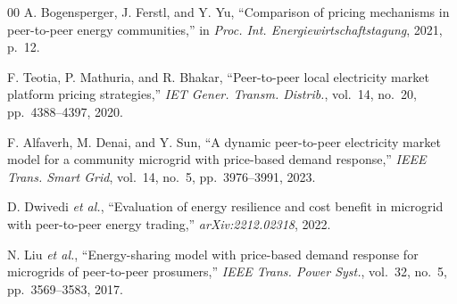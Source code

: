 \documentclass[conference]{IEEEtran}
\begin{document}
{\begin{thebibliography}{00}
A. Bogensperger, J. Ferstl, and Y. Yu, ``Comparison of pricing mechanisms in peer-to-peer energy communities,'' in \textit{Proc. Int. Energiewirtschaftstagung}, 2021, p.~12.

F. Teotia, P. Mathuria, and R. Bhakar, ``Peer-to-peer local electricity market platform pricing strategies,'' \textit{IET Gener. Transm. Distrib.}, vol.~14, no.~20, pp.~4388--4397, 2020.

F. Alfaverh, M. Denai, and Y. Sun, ``A dynamic peer-to-peer electricity market model for a community microgrid with price-based demand response,'' \textit{IEEE Trans. Smart Grid}, vol.~14, no.~5, pp.~3976--3991, 2023.

D. Dwivedi \textit{et al.}, ``Evaluation of energy resilience and cost benefit in microgrid with peer-to-peer energy trading,'' \textit{arXiv:2212.02318}, 2022.

N. Liu \textit{et al.}, ``Energy-sharing model with price-based demand response for microgrids of peer-to-peer prosumers,'' \textit{IEEE Trans. Power Syst.}, vol.~32, no.~5, pp.~3569--3583, 2017.




\end{thebibliography}}
\end{document}
